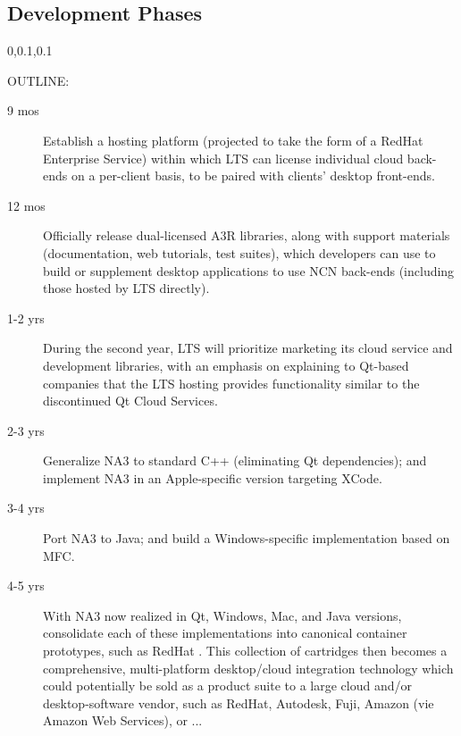 
\begin{frame}{}
\section{Development Phases}


\vspace{-.5em}	

{\Large{}\selectfont
\hspace*{-20pt}
\begin{minipage}{1.1\textwidth}
\vspace{4pt}
\begin{lightquadblockc}{0,0.1,0.1}{\parbox{21cm}{\centering \vspace{10pt}OUTLINE:\vspace{3pt}}}
\hspace{20pt}\begin{minipage}{.9\textwidth}
{\LARGE {}\selectfont \setlength{\leftmargini}{3pt}\begin{description}
\item[9 mos] Establish a hosting platform 
(projected to take the form of a 
RedHat Enterprise Service) within which 
LTS can license individual cloud back-ends 
on a per-client basis, to be paired with 
clients' desktop front-ends. 
\item[12 mos] Officially release dual-licensed 
A3R libraries, along with support materials 
(documentation, web tutorials, test suites), 
which developers can use to build or 
supplement desktop applications to use 
NCN back-ends (including those hosted by 
LTS directly).
\item[1-2 yrs] During the second year, 
LTS will prioritize marketing its 
cloud service and development libraries, 
with an emphasis on explaining to Qt-based 
companies that the LTS hosting provides 
functionality similar to the discontinued 
Qt Cloud Services.   
\item[2-3 yrs] Generalize NA3 to standard 
C++ (eliminating Qt dependencies); and 
implement NA3 in an Apple-specific version 
targeting XCode.  
\item[3-4 yrs] Port NA3 to Java; and 
build a Windows-specific implementation 
based on MFC.
\item[4-5 yrs] With NA3 now realized 
in Qt, Windows, Mac, and Java versions, 
consolidate each of these implementations 
into canonical container prototypes, 
such as RedHat .  This 
collection of cartridges then becomes 
a comprehensive, multi-platform 
desktop/cloud integration technology 
which could potentially be sold as a 
product suite to a large cloud and/or 
desktop-software vendor, such 
as RedHat, Autodesk, Fuji, Amazon 
(vie Amazon Web Services), or ...  
\end{description}}\end{minipage}


\end{lightquadblockc}
\end{minipage}}
\end{frame}
